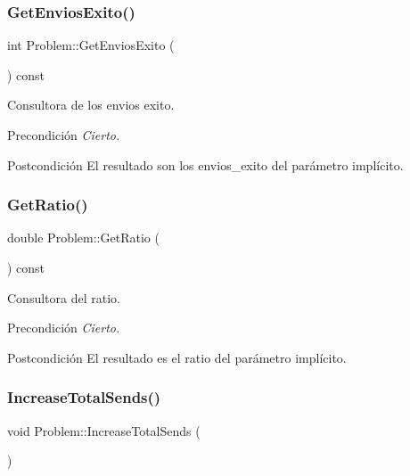 \subsubsection{\texorpdfstring{Get\+Envios\+Exito()}{GetEnviosExito()}}
{\footnotesize\ttfamily int Problem\+::\+Get\+Envios\+Exito (\begin{DoxyParamCaption}{ }\end{DoxyParamCaption}) const}



Consultora de los envios exito. 

\begin{DoxyPrecond}{Precondición}
{\itshape Cierto.} 
\end{DoxyPrecond}
\begin{DoxyPostcond}{Postcondición}
El resultado son los envios\+\_\+exito del parámetro implícito. 
\end{DoxyPostcond}
\mbox{\label{class_problem_a6aceef9e936ee16ef8368803f22a0268}} 
\subsubsection{\texorpdfstring{Get\+Ratio()}{GetRatio()}}
{\footnotesize\ttfamily double Problem\+::\+Get\+Ratio (\begin{DoxyParamCaption}{ }\end{DoxyParamCaption}) const}



Consultora del ratio. 

\begin{DoxyPrecond}{Precondición}
{\itshape Cierto.} 
\end{DoxyPrecond}
\begin{DoxyPostcond}{Postcondición}
El resultado es el ratio del parámetro implícito. 
\end{DoxyPostcond}
\mbox{\label{class_problem_a8afb8fba991ac36958733992a67c8ed6}} 
\subsubsection{\texorpdfstring{Increase\+Total\+Sends()}{IncreaseTotalSends()}}
{\footnotesize\ttfamily void Problem\+::\+Increase\+Total\+Sends (\begin{DoxyParamCaption}{ }\end{DoxyParamCaption})}




